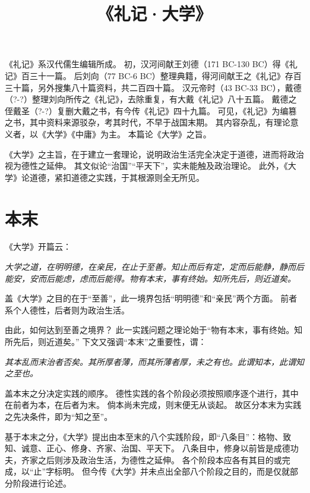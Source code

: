\documentclass[11pt]{article}
\title{《礼记·大学》}
\date{}
\begin{document}
  \maketitle

  \linenumbers
《礼记》系汉代儒生编辑所成。
初，汉河间献王刘德（171 BC-130 BC）得《礼记》百三十一篇。
后刘向（77 BC-6 BC）整理典籍，得河间献王之《礼记》存百三十篇，另外搜集八十篇资料，共二百四十篇。
汉元帝时（43 BC-33 BC），戴德（?-?）整理刘向所传之《礼记》，去除重复，有大戴《礼记》八十五篇。
戴德之侄戴圣（?-?）复删大戴之书，有今传《礼记》四十九篇。
可见，《礼记》为编篡之书，其中资料来源驳杂，考其时代，不早于战国末期。
其内容杂乱，有理论意义者，以《大学》《中庸》为主。
本篇论《大学》之旨。

\newline

《大学》之主旨，在于建立一套理论，说明政治生活完全决定于道德，进而将政治视为德性之延伸。
其文似论“治国”“平天下”，实未能触及政治理论。
此外，《大学》论道德，紧扣道德之实践，于其根源则全无所见。
  
\section{本末}
《大学》开篇云：
  
\textit{大学之道，在明明德，在亲民，在止于至善。知止而后有定，定而后能静，静而后能安，安而后能虑，虑而后能得。物有本末，事有终始。知所先后，则近道矣。}

盖《大学》之目的在于“至善”，此一境界包括“明明德”和“亲民”两个方面。
前者系个人德性，后者则为政治生活。

\newline

由此，如何达到至善之境界？
此一实践问题之理论始于“物有本末，事有终始。知所先后，则近道矣。”
下文又强调“本末”之重要性，谓：

\textit{其本乱而末治者否矣。其所厚者薄，而其所薄者厚，未之有也。此谓知本，此谓知之至也。}
  
盖本末之分决定实践的顺序。
德性实践的各个阶段必须按照顺序逐个进行，其中在前者为本，在后者为末。
倘本尚未完成，则末便无从谈起。
故区分本末为实践之先决条件，即为“知之至”。

\newline

基于本末之分，《大学》提出由本至末的八个实践阶段，即“八条目”：格物、致知、诚意、正心、修身、齐家、治国、平天下。
八条目中，修身以前皆是成德功夫，齐家之后则涉及政治生活，为德性之延伸。
各个阶段本应各有其目的或完成，以“止”字标明。
但今传《大学》并未点出全部八个阶段之目的，而是仅就部分阶段进行论述。
  
\end{document}
